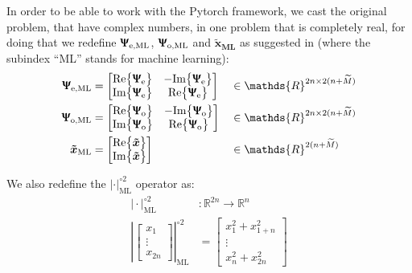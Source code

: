 In order to be able to work with the Pytorch framework, we  cast the original problem, that have complex numbers, in one problem that is completely real, for doing  that we redefine $\bm{\Uppsi_\text{e,ML}}$, $\bm{\Uppsi_\text{o,ML}}$ and $\bm{ \tilde{x}_\text{ML}}$ as suggested in \cite{Neev_2019} (where the subindex ``ML'' stands for machine learning):
\begin{align}
	\bm{\Uppsi_\text{e,ML}}& = \begin{bmatrix}
						\text{Re}\bigl\{ \bm{\Uppsi}_\text{e}\bigr\}&-\text{Im}\bigl\{ \bm{\Uppsi}_\text{e}\bigr\} \\
						\text{Im}\bigl\{ \bm{\Uppsi}_\text{e}\bigr\}&\text{Re}\bigl\{ \bm{\Uppsi}_\text{e}\bigr\} \\
					     \end{bmatrix}&& \in \mathds{R}^{2n\times2(n+\widetilde{M})}\\
	\bm{\Uppsi_\text{o,ML}}& = \begin{bmatrix}
						\text{Re}\bigl\{ \bm{\Uppsi}_\text{o}\bigr\}&-\text{Im}\bigl\{ \bm{\Uppsi}_\text{o}\bigr\} \\
						\text{Im}\bigl\{ \bm{\Uppsi}_\text{o}\bigr\}&\text{Re}\bigl\{ \bm{\Uppsi}_\text{o}\bigr\} \\
					     \end{bmatrix}&& \in \mathds{R}^{2n\times2(n+\widetilde{M})}\\
	\bm{\tilde{x}_\text{ML}}& = \begin{bmatrix}
					\text{Re}\bigl\{ \bm{\tilde{x}}\bigr\}\\
					\text{Im}\bigl\{ \bm{\tilde{x}}\bigr\}
				\end{bmatrix} &&\in \mathds{R}^{2(n+\widetilde{M})}\\
\end{align} 

We also redefine the $|\cdot|^{\circ2}_\text{ML}$ operator as:
\begin{align}
	\bigl|\cdot\bigr|^{\circ2}_\text{ML}&: \mathds{R}^{2n} \rightarrow \mathds{R}^n\\
	\left|\begin{bmatrix}
	x_1\\
	\vdots\\
	x_{2n}
	\end{bmatrix}\right|^{\circ2}_\text{ML}&=
	\begin{bmatrix}
	x_1^2+x_{1+n}^2\\
	\vdots\\
	x_n^2+x_{2n}^2
	\end{bmatrix}
\end{align}

